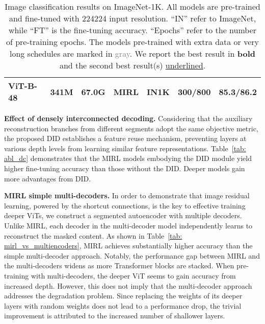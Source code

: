 \documentclass{article}
\begin{document}
\begin{table*}[t]
\begin{tabular}{@{}l c c l c c c@{}}
    \midrule
    ViT-B-48 &  341M & 67.0G & MIRL & IN1K   &  300/800 & 85.3/\textbf{86.2} \\
   
     
     \bottomrule
\end{tabular}
\caption{Image classification results on ImageNet-1K.
All models are pre-trained and fine-tuned with 224224 input resolution.
``IN'' refer to ImageNet, while ``FT'' is the fine-tuning accuracy. ``Epochs'' refer to the number of pre-training epochs. The models pre-trained with extra data or very long schedules are marked in \textcolor{gray}{gray}. We report the best result in \textbf{bold} and the second best result(s) \underline{underlined}.} 
\label{tab: classification_finetune}
\end{table*}


\textbf{Effect of densely interconnected decoding.} 
Considering that the auxiliary reconstruction branches from different segments adopt the same objective metric, the proposed DID establishes a feature reuse mechanism, preventing layers at various depth levels from learning similar feature representations. Table~\ref{tab: abl_dc} demonstrates that the MIRL models embodying the DID module yield higher fine-tuning accuracy than those without the DID. 
Deeper models gain more advantages from DID.


\textbf{MIRL \vs simple multi-decoders.} 
In order to demonstrate that image residual learning, powered by the shortcut connections, is the key to effective training deeper ViTs, we construct a segmented autoencoder with multiple decoders. Unlike MIRL, each decoder in the  multi-decoder model independently learns to reconstruct the masked content.
As shown in Table~\ref{tab: mirl_vs_multiencoders}, MIRL achieves substantially higher accuracy than the simple multi-decoder approach. 
Notably, the performance gap between MIRL and the multi-decoders widens as more Transformer blocks are stacked. 
When pre-training with multi-decoders, the deeper ViT seems to gain accuracy from increased depth. However,  this does not imply that the multi-decoder approach addresses the degradation problem. Since replacing the weights of its deeper layers with random weights does not lead to a performance drop, the trivial improvement is attributed to the increased number of shallower layers. 
\end{document}
